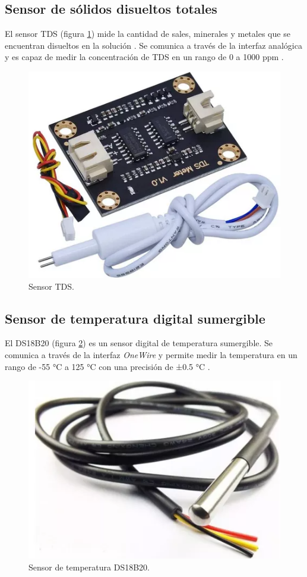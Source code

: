 
\subsection{Sensor de sólidos disueltos totales}

El sensor TDS (figura \ref{fig:TDS}) mide la cantidad de sales, minerales y
metales que se encuentran disueltos en la solución \cite{TDS-description}. Se
comunica a través de la interfaz analógica y es capaz de medir la concentración
de TDS en un rango de 0 a 1000 ppm \cite{TDS-Sensor}.

\begin{figure}[H]
	\centering
	\includegraphics[height=.15\textwidth]{./Images/9.png}
	\caption{Sensor TDS\protect\footnotemark.}
	\label{fig:TDS}
\end{figure}


\subsection{Sensor de temperatura digital sumergible}

El DS18B20 (figura \ref{fig:DS18B20}) es un sensor digital de temperatura
sumergible. Se comunica a través de la interfaz \textit{OneWire} y permite
medir la temperatura en un rango de -55 °C a 125 °C con una precisión de ±0.5
°C \cite{DS18B20}.

\begin{figure}[H]
	\centering
	\includegraphics[height=.15\textwidth]{./Images/10.png}
	\caption{Sensor de temperatura DS18B20\protect\footnotemark.}
	\label{fig:DS18B20}
\end{figure}


